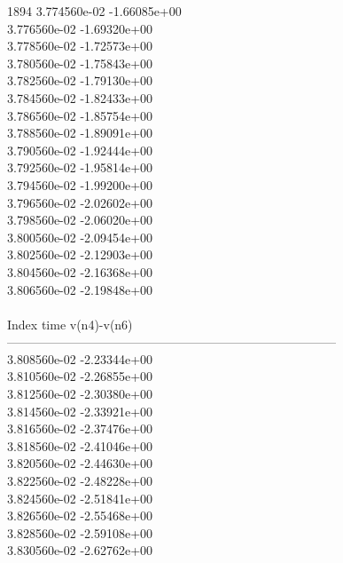 1894	3.774560e-02	-1.66085e+00	\\ 	3.776560e-02	-1.69320e+00	\\ 	3.778560e-02	-1.72573e+00	\\ 	3.780560e-02	-1.75843e+00	\\ 	3.782560e-02	-1.79130e+00	\\ 	3.784560e-02	-1.82433e+00	\\ 	3.786560e-02	-1.85754e+00	\\ 	3.788560e-02	-1.89091e+00	\\ 	3.790560e-02	-1.92444e+00	\\ 	3.792560e-02	-1.95814e+00	\\ 	3.794560e-02	-1.99200e+00	\\ 	3.796560e-02	-2.02602e+00	\\ 	3.798560e-02	-2.06020e+00	\\ 	3.800560e-02	-2.09454e+00	\\ 	3.802560e-02	-2.12903e+00	\\ 	3.804560e-02	-2.16368e+00	\\ 	3.806560e-02	-2.19848e+00	\\ \hline
\\ \hline
Index   time            v(n4)-v(n6)     \\ \hline
--------------------------------------------------------------------------------\\ 	3.808560e-02	-2.23344e+00	\\ 	3.810560e-02	-2.26855e+00	\\ 	3.812560e-02	-2.30380e+00	\\ 	3.814560e-02	-2.33921e+00	\\ 	3.816560e-02	-2.37476e+00	\\ 	3.818560e-02	-2.41046e+00	\\ 	3.820560e-02	-2.44630e+00	\\ 	3.822560e-02	-2.48228e+00	\\ 	3.824560e-02	-2.51841e+00	\\ 	3.826560e-02	-2.55468e+00	\\ 	3.828560e-02	-2.59108e+00	\\ 	3.830560e-02	-2.62762e+00	\\ \hline
